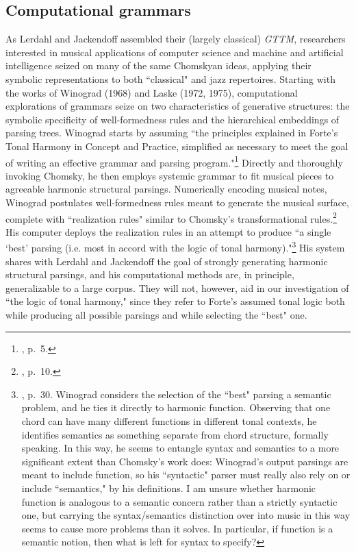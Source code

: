 \subsection{Computational grammars}
As Lerdahl and Jackendoff assembled their (largely classical) \emph{GTTM}, researchers interested in musical applications of computer science and machine and artificial intelligence seized on many of the same Chomskyan ideas, applying their symbolic representations to both ``classical" and jazz repertoires.  Starting with the works of Winograd (1968) and Laske (1972, 1975), computational explorations of grammars seize on two characteristics of generative structures: the symbolic specificity of well-formedness rules and the hierarchical embeddings of parsing trees.  Winograd starts by assuming ``the principles explained in Forte's Tonal Harmony in Concept and Practice, simplified as necessary to meet the goal of writing an effective grammar and parsing program."\footnote{\cite{winograd1968}, p.\ 5.}  Directly and thoroughly invoking Chomsky, he then employs systemic grammar to fit musical pieces to agreeable harmonic structural parsings.  Numerically encoding musical notes, Winograd postulates well-formedness rules meant to generate the musical surface, complete with ``realization rules" similar to Chomsky's transformational rules.\footnote{\cite{winograd1968}, p.\ 10.}  His computer deploys the realization rules in an attempt to produce ``a single `best' parsing (i.e. most in accord with the logic of tonal harmony)."\footnote{\cite{winograd1968}, p.\ 30.  Winograd considers the selection of the ``best" parsing a semantic problem, and he ties it directly to harmonic function.  Observing that one chord can have many different functions in different tonal contexts, he identifies semantics as something separate from chord structure, formally speaking.  In this way, he seems to entangle syntax and semantics to a more significant extent than Chomsky's work does: Winograd's output parsings are meant to include function, so his ``syntactic" parser must really also rely on or include ``semantics," by his definitions.  I am unsure whether harmonic function is analogous to a semantic concern rather than a strictly syntactic one, but carrying the syntax/semantics distinction over into music in this way seems to cause more problems than it solves.  In particular, if function is a semantic notion, then what is left for syntax to specify?}  His system shares with Lerdahl and Jackendoff the goal of strongly generating harmonic structural parsings, and his computational methods are, in principle, generalizable to a large corpus.  They will not, however, aid in our investigation of ``the logic of tonal harmony," since they refer to Forte's assumed tonal logic both while producing all possible parsings and while selecting the ``best" one.

